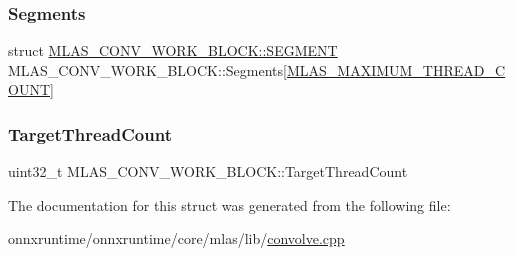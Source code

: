 \subsubsection{\texorpdfstring{Segments}{Segments}}
{\footnotesize\ttfamily struct \mbox{\hyperlink{structMLAS__CONV__WORK__BLOCK_1_1SEGMENT}{M\+L\+A\+S\+\_\+\+C\+O\+N\+V\+\_\+\+W\+O\+R\+K\+\_\+\+B\+L\+O\+C\+K\+::\+S\+E\+G\+M\+E\+NT}}  M\+L\+A\+S\+\_\+\+C\+O\+N\+V\+\_\+\+W\+O\+R\+K\+\_\+\+B\+L\+O\+C\+K\+::\+Segments\mbox{[}\mbox{\hyperlink{mlasi_8h_a86466d6811df85b69801ae746e3ad493}{M\+L\+A\+S\+\_\+\+M\+A\+X\+I\+M\+U\+M\+\_\+\+T\+H\+R\+E\+A\+D\+\_\+\+C\+O\+U\+NT}}\mbox{]}}

\mbox{\label{structMLAS__CONV__WORK__BLOCK_a8ff37b91aebeb33c8fe1c3c38168d476}} 
\subsubsection{\texorpdfstring{Target\+Thread\+Count}{TargetThreadCount}}
{\footnotesize\ttfamily uint32\+\_\+t M\+L\+A\+S\+\_\+\+C\+O\+N\+V\+\_\+\+W\+O\+R\+K\+\_\+\+B\+L\+O\+C\+K\+::\+Target\+Thread\+Count}



The documentation for this struct was generated from the following file\+:\begin{DoxyCompactItemize}
\item 
onnxruntime/onnxruntime/core/mlas/lib/\mbox{\hyperlink{convolve_8cpp}{convolve.\+cpp}}\end{DoxyCompactItemize}
